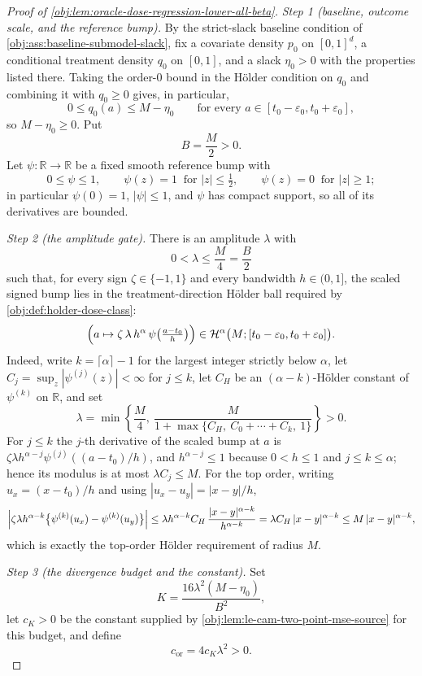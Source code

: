 \documentclass[11pt]{article}
\begin{document}
\begin{proof}[Proof of \cref{obj:lem:oracle-dose-regression-lower-all-beta}]
\emph{Step 1 (baseline, outcome scale, and the reference bump).} By the strict-slack baseline
condition of \cref{obj:ass:baseline-submodel-slack}, fix a covariate density \(p_0\) on
\([0,1]^d\), a conditional treatment density \(q_0\) on \([0,1]\), and a slack \(\eta_0>0\) with the
properties listed there. Taking the order-\(0\) bound in the Hölder condition on \(q_0\) and
combining it with \(q_0\ge 0\) gives, in particular,
\[
0\le q_0(a)\le M-\eta_0
\qquad\text{for every }a\in[t_0-\varepsilon_0,t_0+\varepsilon_0],
\]
so \(M-\eta_0\ge 0\). Put
\[
B=\frac M2>0 .
\]
Let \(\psi:\mathbb R\to\mathbb R\) be a fixed smooth reference bump with
\[
0\le\psi\le 1,
\qquad
\psi(z)=1\ \text{ for }|z|\le\tfrac12,
\qquad
\psi(z)=0\ \text{ for }|z|\ge 1 ;
\]
in particular \(\psi(0)=1\), \(|\psi|\le 1\), and \(\psi\) has compact support, so all of its
derivatives are bounded. %

\emph{Step 2 (the amplitude gate).} There is an amplitude \(\lambda\) with
\[
0<\lambda\le\frac M4=\frac B2
\]
such that, for every sign \(\zeta\in\{-1,1\}\) and every bandwidth \(h\in(0,1]\), the scaled signed
bump lies in the treatment-direction Hölder ball required by \cref{obj:def:holder-dose-class}:
\[
\Bigl(a\mapsto \zeta\,\lambda\,h^{\alpha}\,\psi\!\left(\tfrac{a-t_0}{h}\right)\Bigr)
\in
\mathcal H^{\alpha}\bigl(M;[t_0-\varepsilon_0,t_0+\varepsilon_0]\bigr).
\]
Indeed, write \(k=\lceil\alpha\rceil-1\) for the largest integer strictly below \(\alpha\), let
\(C_j=\sup_z|\psi^{(j)}(z)|<\infty\) for \(j\le k\), let \(C_H\) be an \((\alpha-k)\)-Hölder constant of
\(\psi^{(k)}\) on \(\mathbb R\), and set
\[
\lambda=\min\left\{\frac M4,\ \frac{M}{1+\max\{C_H,\ C_0+\cdots+C_k,\ 1\}}\right\}>0 .
\]
For \(j\le k\) the \(j\)-th derivative of the scaled bump at \(a\) is
\(\zeta\lambda h^{\alpha-j}\psi^{(j)}((a-t_0)/h)\), and \(h^{\alpha-j}\le 1\) because \(0<h\le1\) and
\(j\le k\le\alpha\); hence its modulus is at most \(\lambda C_j\le M\). For the top order, writing
\(u_x=(x-t_0)/h\) and using \(|u_x-u_y|=|x-y|/h\),
\[
\Bigl|\zeta\lambda h^{\alpha-k}\bigl\{\psi^{(k)}(u_x)-\psi^{(k)}(u_y)\bigr\}\Bigr|
\le
\lambda h^{\alpha-k}C_H\,\frac{|x-y|^{\alpha-k}}{h^{\alpha-k}}
=
\lambda C_H\,|x-y|^{\alpha-k}
\le
M\,|x-y|^{\alpha-k},
\]
which is exactly the top-order Hölder requirement of radius \(M\). %

\emph{Step 3 (the divergence budget and the constant).} Set
\[
K=\frac{16\lambda^2(M-\eta_0)}{B^2},
\]
let \(c_K>0\) be the constant supplied by \cref{obj:lem:le-cam-two-point-mse-source} for this budget,
and define
\[
c_{\mathrm{or}}=4c_K\lambda^2>0 .
\]


\end{proof}
\end{document}
